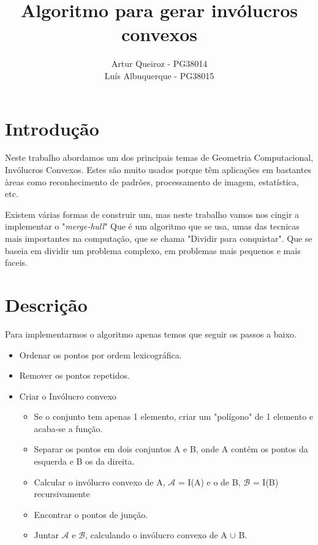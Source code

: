 \documentclass[11pt]{article}
\title{Algoritmo para gerar invólucros convexos}
\author{Artur Queiroz - PG38014\\Luís Albuquerque - PG38015}
\begin{document}
\maketitle

\section{Introdução}
Neste trabalho abordamos um dos principais temas de Geometria 
Computacional, Invólucros Convexos.
Estes são muito usados porque têm aplicações em bastantes àreas
como reconhecimento de padrões, processamento de imagem, 
estatística, etc.

Existem várias formas de construir um, mas neste trabalho vamos
nos cingir a implementar o "\textit{merge-hull}"
Que é um algoritmo que se usa, umas das tecnicas mais importantes
na computação, que se chama "Dividir para conquistar".
Que se baseia em dividir um problema complexo, em problemas mais 
pequenos e mais faceis.

\section{Descrição}
Para implementarmos o algoritmo apenas temos que seguir os passos
a baixo.

\begin{itemize}
    \item Ordenar os pontos por ordem lexicográfica.
    \item Remover os pontos repetidos.
    \item Criar o Invólucro convexo
    \begin{itemize}
        \item Se o conjunto tem apenas 1 elemento, criar um "polígono"
            de 1 elemento e acaba-se a função.
        \item Separar os pontos em dois conjuntos A e B, 
            onde A contém os pontos da esquerda e B os da direita.
        \item Calcular o invólucro convexo de A, 
            $\mathcal{A}$ = I(A) e o de B, $\mathcal{B}$ = I(B) recursivamente
        \item Encontrar o pontos de junção.
        \item Juntar $\mathcal{A}$ e $\mathcal{B}$, 
            calculando o invólucro convexo de A $\cup$ B.
    \end{itemize}
\end{itemize}
\end{document}
